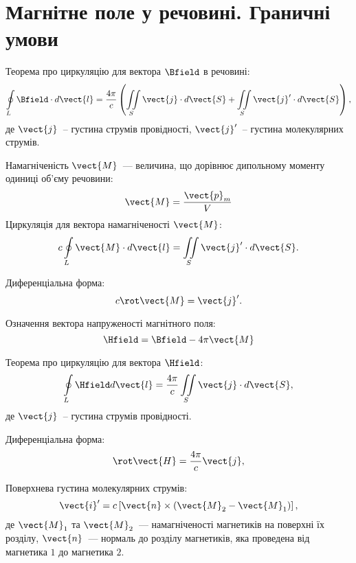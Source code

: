 \section{Магнітне поле у речовині. Граничні умови}

\begin{Theory}\small

  Теорема про циркуляцію для вектора $\Bfield$ в речовині:
  \begin{equation}
	  \oint\limits_{L} \Bfield\cdot d\vect{l} = \frac{4\pi}{c}\left( \iint\limits_S \vect{j} \cdot d\vect{S} + \iint\limits_S \vect{j}'\cdot d\vect{S}\right) ,
  \end{equation}
  де $\vect{j}$~-- густина струмів провідності,  $\vect{j}'$~-- густина молекулярних струмів.

  Намагніченість $\vect{M}$~--- величина, що дорівнює дипольному моменту одиниці об'єму речовини:
	\begin{equation}
		\vect{M} = \frac{\vect{p}_m}{V}
	\end{equation}
  Циркуляція для вектора намагніченості $\vect{M}$:
  \begin{equation}
	  c\oint\limits_{L} \vect{M} \cdot d\vect{l} = \iint\limits_S \vect{j}' \cdot d\vect{S}.
  \end{equation}

  Диференціальна форма:
  \begin{equation}
	  c\rot\vect{M} = \vect{j}'.
  \end{equation}


  Означення вектора напруженості магнітного поля:
  \begin{equation}
	  \Hfield = \Bfield - 4\pi\vect{M}
  \end{equation}

  Теорема про циркуляцію для вектора $\Hfield$:
  \begin{equation}
	  \oint\limits_{L} \Hfield d\vect{l} = \frac{4\pi}{c}\iint\limits_S \vect{j} \cdot d\vect{S},
  \end{equation}
де $\vect{j}$~-- густина струмів провідності.

Диференціальна форма:
  \begin{equation}
	  \rot\vect{H} = \frac{4\pi}{c}\vect{j},
  \end{equation}

Поверхнева густина молекулярних струмів:
\begin{equation}
	\vect{i}' = c\left[\vect{n}\times(\vect{M}_2 - \vect{M}_1) \right],
\end{equation}
де $\vect{M}_1$ та $\vect{M}_2$~--- намагніченості магнетиків на поверхні їх розділу, $\vect{n}$~--- нормаль до розділу магнетиків, яка проведена від магнетика $1$ до магнетика $2$.


\end{Theory}
